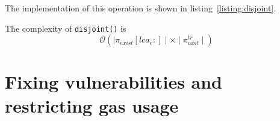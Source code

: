 The implementation of this operation is shown in
listing~\ref{listing:disjoint}.



The complexity of \texttt{disjoint()} is
\[ \mathcal{O}(\mid\pi_{exist}[lca_{e}:]\mid \times
\mid\pi_{cont}^{tr}\mid) \]

\section{Fixing vulnerabilities and restricting gas usage}

%
%
